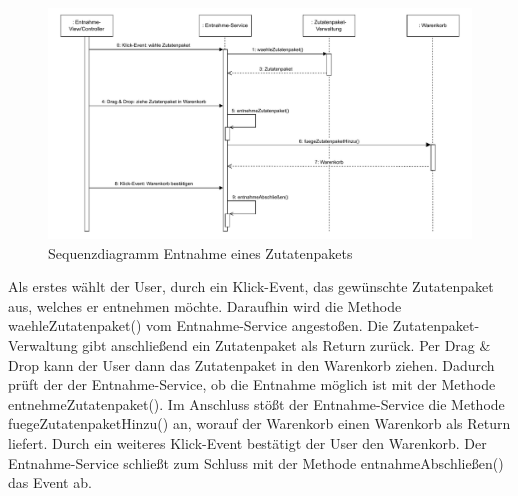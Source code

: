 \begin{figure}[H]
    \centering
    \includegraphics[width=1\textwidth]{Bilder/Kapitel/Laufzeitsicht/Sequenzdiagramm_Entnahme-Zutatenpaket}
    \caption{Sequenzdiagramm Entnahme eines Zutatenpakets}
    \label{fig:Sequenzdiagramm_Entnahme_Zutatenpaket}
\end{figure}

Als erstes wählt der User, durch ein Klick-Event, das gewünschte Zutatenpaket aus, welches er entnehmen möchte. Daraufhin
wird die Methode waehleZutatenpaket() vom Entnahme-Service angestoßen. Die Zutatenpaket-Verwaltung gibt anschließend
ein Zutatenpaket als Return zurück. Per Drag \& Drop kann der User dann das Zutatenpaket in den Warenkorb ziehen.
Dadurch prüft der der Entnahme-Service, ob die Entnahme möglich ist mit der Methode entnehmeZutatenpaket(). Im Anschluss stößt
der Entnahme-Service die Methode fuegeZutatenpaketHinzu() an, worauf der Warenkorb einen Warenkorb als Return liefert.
Durch ein weiteres Klick-Event bestätigt der User den Warenkorb. Der Entnahme-Service schließt zum Schluss mit der Methode
entnahmeAbschließen() das Event ab.

